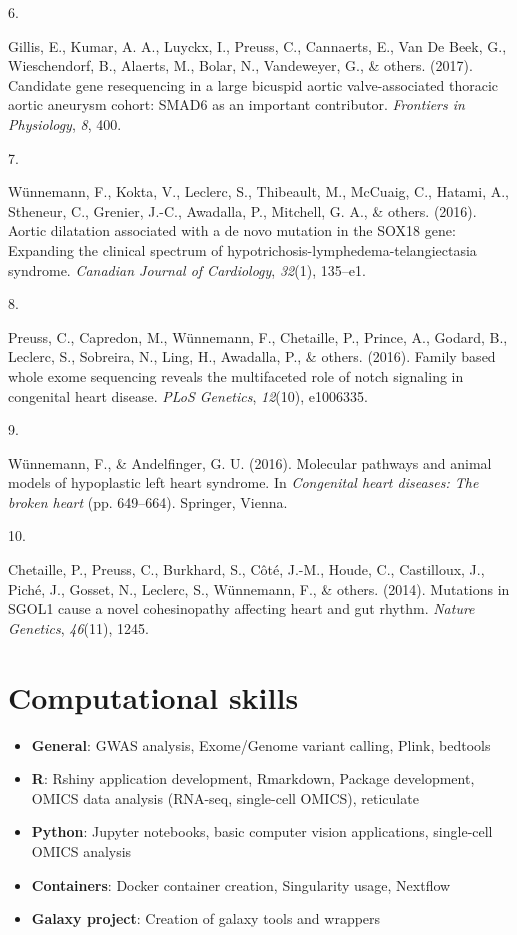\documentclass[11pt, a4paper]{awesome-cv}
\providecommand{\tightlist}{%
	\setlength{\itemsep}{0pt}\setlength{\parskip}{0pt}}
\newlength{\csllabelwidth}
\newcommand{\CSLLeftMargin}[1]{\parbox[t]{\csllabelwidth}{#1}}
\newcommand{\CSLRightInline}[1]{\parbox[t]{\linewidth - \csllabelwidth}{#1}}
\begin{document}
\leavevmode\hypertarget{ref-gillis2017candidate}{}%
\CSLLeftMargin{6. }
\CSLRightInline{Gillis, E., Kumar, A. A., Luyckx, I., Preuss, C.,
Cannaerts, E., Van De Beek, G., Wieschendorf, B., Alaerts, M., Bolar,
N., Vandeweyer, G., \& others. (2017). Candidate gene resequencing in a
large bicuspid aortic valve-associated thoracic aortic aneurysm cohort:
SMAD6 as an important contributor. \emph{Frontiers in Physiology},
\emph{8}, 400.}

\leavevmode\hypertarget{ref-wunnemann2016aortic}{}%
\CSLLeftMargin{7. }
\CSLRightInline{Wünnemann, F., Kokta, V., Leclerc, S., Thibeault, M.,
McCuaig, C., Hatami, A., Stheneur, C., Grenier, J.-C., Awadalla, P.,
Mitchell, G. A., \& others. (2016). Aortic dilatation associated with a
de novo mutation in the SOX18 gene: Expanding the clinical spectrum of
hypotrichosis-lymphedema-telangiectasia syndrome. \emph{Canadian Journal
of Cardiology}, \emph{32}(1), 135--e1.}

\leavevmode\hypertarget{ref-preuss2016family}{}%
\CSLLeftMargin{8. }
\CSLRightInline{Preuss, C., Capredon, M., Wünnemann, F., Chetaille, P.,
Prince, A., Godard, B., Leclerc, S., Sobreira, N., Ling, H., Awadalla,
P., \& others. (2016). Family based whole exome sequencing reveals the
multifaceted role of notch signaling in congenital heart disease.
\emph{PLoS Genetics}, \emph{12}(10), e1006335.}

\leavevmode\hypertarget{ref-wunnemann2016molecular}{}%
\CSLLeftMargin{9. }
\CSLRightInline{Wünnemann, F., \& Andelfinger, G. U. (2016). Molecular
pathways and animal models of hypoplastic left heart syndrome. In
\emph{Congenital heart diseases: The broken heart} (pp. 649--664).
Springer, Vienna.}

\leavevmode\hypertarget{ref-chetaille2014mutations}{}%
\CSLLeftMargin{10. }
\CSLRightInline{Chetaille, P., Preuss, C., Burkhard, S., Côté, J.-M.,
Houde, C., Castilloux, J., Piché, J., Gosset, N., Leclerc, S.,
Wünnemann, F., \& others. (2014). Mutations in SGOL1 cause a novel
cohesinopathy affecting heart and gut rhythm. \emph{Nature Genetics},
\emph{46}(11), 1245.}

\hypertarget{computational-skills}{%
\section{\texorpdfstring{ Computational
skills}{ Computational skills}}\label{computational-skills}}

\begin{itemize}
\tightlist
\item
  \textbf{General}: GWAS analysis, Exome/Genome variant calling, Plink,
  bedtools
\item
  \textbf{R}: Rshiny application development, Rmarkdown, Package
  development, OMICS data analysis (RNA-seq, single-cell OMICS),
  reticulate
\item
  \textbf{Python}: Jupyter notebooks, basic computer vision
  applications, single-cell OMICS analysis
\item
  \textbf{Containers}: Docker container creation, Singularity usage,
  Nextflow
\item
  \textbf{Galaxy project}: Creation of galaxy tools and wrappers
\end{itemize}
\end{document}
